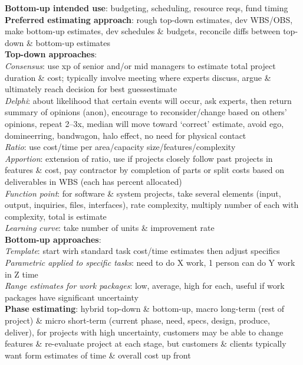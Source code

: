 \documentclass[a4paper]{article}
\begin{document}
\begin{multicols}{2}
        \textbf{Bottom-up intended use}: budgeting, scheduling, resource reqs, fund timing\\
        \textbf{Preferred estimating approach}: rough top-down estimates, dev WBS/OBS, make bottom-up estimates, dev schedules \& budgets, reconcile diffs between top-down \& bottom-up estimates\\
        \textbf{Top-down approaches}:\\
        \textit{Consensus}: use xp of senior and/or mid managers to estimate total project duration \& cost; typically involve meeting where experts discuss, argue \& ultimately reach decision for best guessestimate\\
        \textit{Delphi}: about likelihood that certain events will occur, ask experts, then return summary of opinions (anon), encourage to reconsider/change based on others' opinions, repeat 2--3x, median will move toward `correct' estimate, avoid ego, domineerring, bandwagon, halo effect, no need for physical contact\\
        \textit{Ratio}: use cost/time per area/capacity size/features/complexity\\
        \textit{Apportion}: extension of ratio, use if projects closely follow past projects in features \& cost, pay contractor by completion of parts or split costs based on deliverables in WBS (each has percent allocated)\\
        \textit{Function point}: for software \& system projects, take several elements (input, output, inquiries, files, interfaces), rate complexity, multiply number of each with complexity, total is estimate\\
        \textit{Learning curve}: take number of units \& improvement rate\\
        \textbf{Bottom-up approaches}:\\
        \textit{Template}: start wirh standard task cost/time estimates then adjust specifics\\
        \textit{Parametric applied to specific tasks}: need to do X work, 1 person can do Y work in Z time\\
        \textit{Range estimates for work packages}: low, average, high for each, useful if work packages have significant uncertainty\\
        \textbf{Phase estimating}: hybrid top-down \& bottom-up, macro long-term (rest of project) \& micro short-term (current phase, need, specs, design, produce, deliver), for projects with high uncertainty, customers may be able to change features \& re-evaluate project at each stage, but customers \& clients typically want form estimates of time \& overall cost up front\\

\end{multicols}
\end{document}
